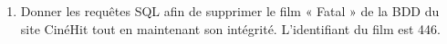\documentclass[a4paper,12pt,eval,firamath]{nsi}
\begin{document}
\begin{enumerate}
   
    \item Donner les requêtes SQL afin de supprimer le film « Fatal » de la BDD du site CinéHit tout en maintenant son intégrité. L'identifiant du film est 446.\\
          
\end{enumerate}
\end{document}
